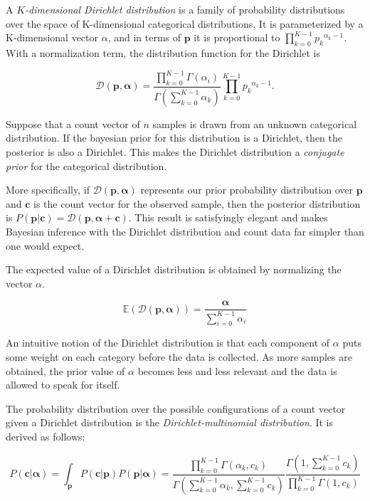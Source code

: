 \documentclass[twoside]{article}
\begin{document}
A \textit{\(K\)-dimensional Dirichlet distribution} is a family of probability distributions over the space of K-dimensional categorical distributions. It is parameterized by a K-dimensional vector $\alpha$, and in terms of $\mathbf{p}$ it is proportional to $\prod_{k=0}^{K-1}{p_k}^{\alpha_k-1}$. With a normalization term, the distribution function for the Dirichlet is

\begin{equation}
\label{eq:dirich_distr}
\mathcal{D}(\mathbf{p},\mathbf{\alpha})=\frac{\prod_{k=0}^{K-1}\Gamma(\alpha_i)}{\Gamma\left(\sum_{k=0}^{K-1}\alpha_k\right)}\prod_{k=0}^{K-1}{p_k}^{\alpha_k-1}.
\end{equation}

Suppose that a count vector of \(n\) samples is drawn from an unknown categorical distribution. If the bayesian prior for this distribution is a Dirichlet, then the posterior is also a Dirichlet. This makes the Dirichlet distribution a \textit{conjugate prior} for the categorical distribution.

More specifically, if \(\mathcal{D}(\mathbf{p},\mathbf{\alpha})\) represents our prior probability distribution over \(\mathbf{p}\) and \(\mathbf{c}\) is the count vector for the observed sample, then the posterior distribution is $P(\mathbf{p} | \mathbf{c})=\mathcal{D}(\mathbf{p},\mathbf{\alpha} + \mathbf{c})$. This result is satisfyingly elegant and makes Bayesian inference with the Dirichlet distribution and count data far simpler than one would expect.

The expected value of a Dirichlet distribution is obtained by normalizing the vector $\alpha$.

\[\mathbb{E}(\mathcal{D}(\mathbf{p},\mathbf{\alpha}))=\frac{\mathbf{\alpha}}{\sum_{i=0}^{K-1}\alpha_i}\]

An intuitive notion of the Dirichlet distribution is that each component of $\alpha$ puts some weight on each category before the data is collected. As more samples are obtained, the prior value of $\alpha$ becomes less and less relevant and the data is allowed to speak for itself.

The probability distribution over the possible configurations of a count vector given a Dirichlet distribution is the \textit{Dirichlet-multinomial distribution}.  It is derived as follows:

\begin{equation}
P(\mathbf{c}|\mathbf{\alpha})=\int_{\mathbf{p}}P(\mathbf{c}|\mathbf{p})P(\mathbf{p}|\mathbf{\alpha})=
\frac{\prod_{k=0}^{K-1}\Gamma(\alpha_k,c_k)}{\Gamma\left(\sum_{k=0}^{K-1}\alpha_k,\sum_{k=0}^{K-1}c_k\right)}
\frac{\Gamma\left(1,\sum_{k=0}^{K-1}c_k\right)}{\prod_{k=0}^{K-1}\Gamma(1,c_k)}
\label{eq:dirichlet_multinomial_formula}
\end{equation}
\end{document}
